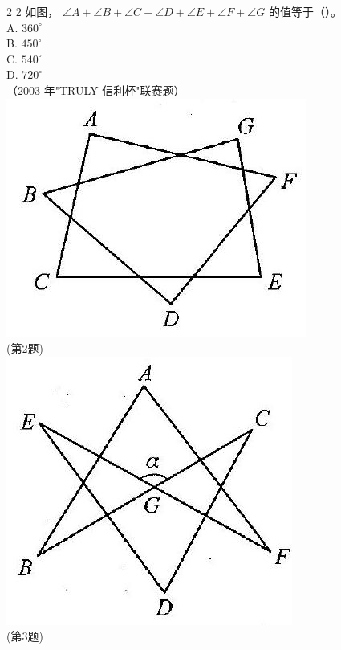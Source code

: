\documentclass[10pt]{article}
\begin{document}
2 2 如图， $\angle A+\angle B+\angle C+\angle D+\angle E+\angle F+\angle G$ 的值等于（）。\\
A. $360^{\circ}$\\
B. $450^{\circ}$\\
C. $540^{\circ}$\\
D. $720^{\circ}$\\
（2003 年"TRULY 信利杯"联赛题）\\
\includegraphics[max width=\textwidth, center]{2024_10_30_2c8f45efd4a519b08e1ag-012(2)}\\
(第2题)\\
\includegraphics[max width=\textwidth, center]{2024_10_30_2c8f45efd4a519b08e1ag-012}\\
(第3题)
\end{document}
